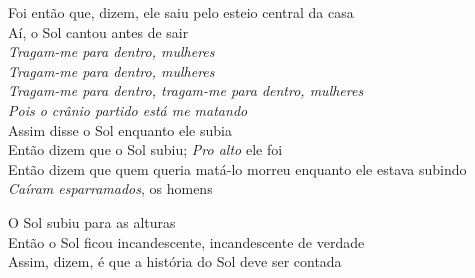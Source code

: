 \begin{linenumbers}\begingroup\raggedright
\noindent Foi então que, dizem, ele saiu pelo esteio central da casa\\
Aí, o Sol cantou antes de sair\\
\emph{Tragam-me para dentro, mulheres}\\
\emph{Tragam-me para dentro, mulheres}\\
\emph{Tragam-me para dentro, tragam-me para dentro, mulheres}\\
\emph{Pois o crânio partido está me matando}\\
Assim disse o Sol enquanto ele subia\\
Então dizem que o Sol subiu; \emph{Pro alto} ele foi\\
Então dizem que quem queria matá-lo morreu enquanto ele estava subindo\\
\emph{Caíram esparramados}, os homens
\end{linenumbers}\endgroup

\bigskip

\begin{linenumbers}\begingroup\raggedright
\noindent O Sol subiu para as alturas\\
Então o Sol ficou incandescente, incandescente de verdade\\
Assim, dizem, é que a história do Sol deve ser contada
\end{linenumbers}\endgroup

